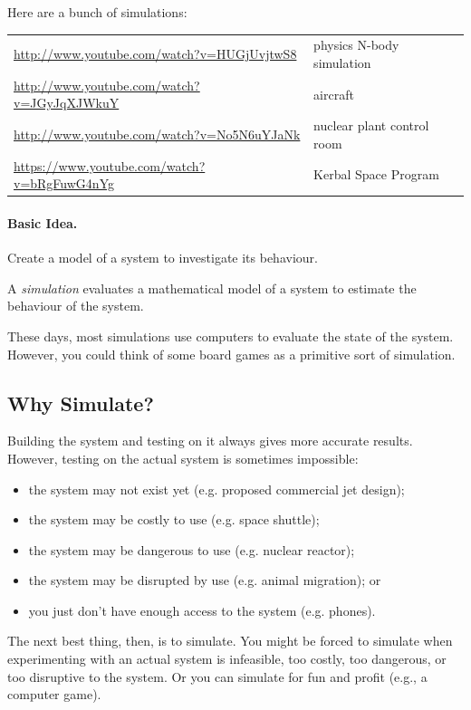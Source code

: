 




Here are a bunch of simulations:

\begin{tabular}{ll}
\url{http://www.youtube.com/watch?v=HUGjUvjtwS8} & physics N-body simulation \\
\url{http://www.youtube.com/watch?v=JGyJqXJWkuY} & aircraft \\
\url{http://www.youtube.com/watch?v=No5N6uYJaNk} & nuclear plant control room\\
\url{https://www.youtube.com/watch?v=bRgFuwG4nYg} & Kerbal Space Program
\end{tabular}

\paragraph{Basic Idea.} Create a model of a system to investigate 
its behaviour.

A \emph{simulation} evaluates a mathematical model of a system to
estimate the behaviour of the system.

These days, most simulations use computers to evaluate the state of
the system. However, you could think of some board games as a
primitive sort of simulation.

\subsection*{Why Simulate?}
Building the system and testing on it always gives more accurate
results. However, testing on the actual system is sometimes impossible:
\begin{itemize}
\item the system may not exist yet (e.g. proposed commercial jet design);
\item the system may be costly to use (e.g. space shuttle);
\item the system may be dangerous to use (e.g. nuclear reactor);
\item the system may be disrupted by use (e.g. animal migration); or
\item you just don't have enough access to the system (e.g. phones).
\end{itemize}

The next best thing, then, is to simulate. You might be forced to
simulate when experimenting with an actual system is infeasible, too
costly, too dangerous, or too disruptive to the system. Or you can simulate
for fun and profit (e.g., a computer game).

